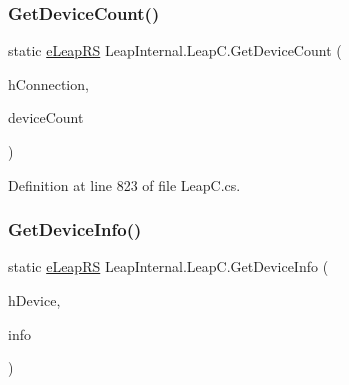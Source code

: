 \mbox{\label{class_leap_internal_1_1_leap_c_ab705081937bf1a4cf7f69f3298991c5a}} 
\subsubsection{\texorpdfstring{GetDeviceCount()}{GetDeviceCount()}}
{\footnotesize\ttfamily static \mbox{\hyperlink{namespace_leap_internal_ae50b07d24c508b84273392b6dcbea1d9}{e\+Leap\+RS}} Leap\+Internal.\+Leap\+C.\+Get\+Device\+Count (\begin{DoxyParamCaption}\item[{Int\+Ptr}]{h\+Connection,  }\item[{out U\+Int32}]{device\+Count }\end{DoxyParamCaption})\hspace{0.3cm}{\ttfamily [static]}}



Definition at line 823 of file Leap\+C.\+cs.

\mbox{\label{class_leap_internal_1_1_leap_c_a2dc6de06ea26d56d00ab08f738eff9ef}} 
\subsubsection{\texorpdfstring{GetDeviceInfo()}{GetDeviceInfo()}}
{\footnotesize\ttfamily static \mbox{\hyperlink{namespace_leap_internal_ae50b07d24c508b84273392b6dcbea1d9}{e\+Leap\+RS}} Leap\+Internal.\+Leap\+C.\+Get\+Device\+Info (\begin{DoxyParamCaption}\item[{Int\+Ptr}]{h\+Device,  }\item[{ref \mbox{\hyperlink{struct_leap_internal_1_1_l_e_a_p___d_e_v_i_c_e___i_n_f_o}{L\+E\+A\+P\+\_\+\+D\+E\+V\+I\+C\+E\+\_\+\+I\+N\+FO}}}]{info }\end{DoxyParamCaption})}

\mbox{\label{class_leap_internal_1_1_leap_c_a4e3fe78202056e73c092818ecce8ee6f}} 
